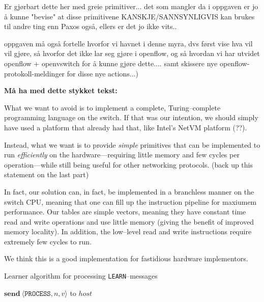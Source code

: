 Er gjørbart dette her med greie primitiver... det som mangler da i oppgaven
er jo å kunne "bevise" at disse primitivene KANSKJE/SANNSYNLIGVIS kan brukes
til andre ting enn Paxos også, ellers er det jo ikke vits..

oppgaven må også fortelle hvorfor vi havnet i denne myra, dvs først vise hva
vil vil gjøre, så hvorfor det ikke lar seg gjøre i openflow, og så hvordan
vi har utvidet openflow + openvswitch for å kunne gjøre dette....
samt skissere nye openflow-protokoll-meldinger for disse nye actions...)

\textbf{Må ha med dette stykket tekst:}

What we want to avoid is to implement a complete, Turing--complete
programming language on the switch.  If that was our intention, we should
simply have used a platform that already had that, like Intel's NetVM
platform (??).

Instead, what we want is to provide \textit{simple} primitives that can be
implemented to run \textit{efficiently} on the hardware---requiring little
memory and few cycles per operation---while still being useful for other
networking protocols. (back up this statement on the last part)

In fact, our solution can, in fact, be implemented in a branchless manner on the
switch CPU, meaning that one can fill up the instruction pipeline for
maxiumem performance.  Our tables are simple vectors, meaning they
have constant time read and write operations and use little memory
(giving the benefit of improved memory locality).  In addition, the
low--level read and write instructions require extremely few cycles to run.

We think this is a good implementation for fastidious hardware implementors.

\begin{algorithm}[H]
  \caption{Learner algorithm for processing \texttt{LEARN}--messages}
  \label{paxos.algorithm.learner}
  \begin{algorithmic}
        \State $\textbf{send}~\langle \texttt{PROCESS}, n, v \rangle$ to $host$
      \EndFor
    \EndOn
  \end{algorithmic}
\end{algorithm}


